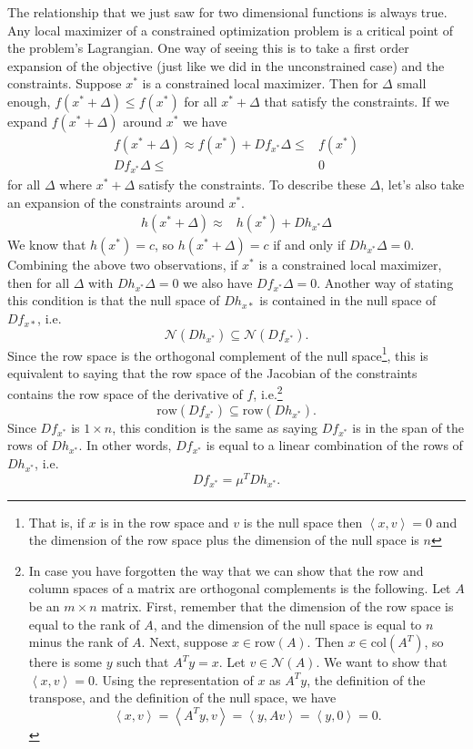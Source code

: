 \documentclass[12pt,reqno]{amsart}
\theoremstyle{definition}
\newcommand{\iprod}[2]{\left\langle {#1} , {#2} \right\rangle}
\begin{document}
The relationship that we just saw for two dimensional functions is
always true. Any local maximizer of a constrained optimization problem
is a critical point of the problem's Lagrangian. One way of seeing
this is to take a first order expansion of the objective (just like we
did in the unconstrained case) and the constraints. Suppose $x^*$ is a
constrained local maximizer. Then for $\Delta$ small enough, $f(x^* +
\Delta) \leq f(x^*)$ for all $x^*+ \Delta$ that satisfy the
constraints. If we expand $f(x^*+\Delta)$ around $x^*$ we have
\begin{align*}
  f(x^*+\Delta) \approx f(x^*) + Df_{x^*} \Delta \leq & f(x^*) \\
  Df_{x^*} \Delta \leq & 0 
\end{align*}
for all $\Delta$ where $x^* + \Delta$ satisfy the constraints. To describe these
$\Delta$, let's also take an expansion of the constraints around $x^*$.
\begin{align*}
  h(x^* + \Delta) \approx & h(x^*) + Dh_{x^*} \Delta
\end{align*}
We know that $h(x^*) = c$, so $h(x^* + \Delta) = c$ if and only if
$Dh_{x^*} \Delta = 0$. Combining the above two observations, if $x^*$
is a constrained local maximizer, then for all $\Delta$ with $Dh_{x^*}
\Delta = 0$ we also have $Df_{x^*} \Delta  = 0$. Another way of
stating this condition is that the null space of $Dh_{x*}$ is
contained in the null space of $Df_{x*}$, i.e.
\[ \mathcal{N}(Dh_{x^*}) \subseteq \mathcal{N}(Df_{x^*}). \] Since the
row space is the orthogonal complement of the null space\footnote{That
  is, if $x$ is in the row space and $v$ is the null space then
  $\iprod{x}{v} = 0$ and the dimension of the row space plus the
  dimension of the null space is $n$}, this is equivalent to saying
that the row space of the Jacobian of the constraints contains the row
space of the derivative of $f$, i.e.\footnote{In case you have
  forgotten the way that we can show that the row and column spaces of
  a matrix are orthogonal complements is the following. Let $A$ be an
  $m \times n$ matrix. First, remember that the dimension of the row
  space is equal to the rank of $A$, and the dimension of the null
  space is equal to $n$ minus the rank of $A$. Next, suppose $x \in
  \mathrm{row}(A)$. Then $x \in \mathrm{col}(A^T)$, so there is some
  $y$ such that $A^T y = x$. Let $v \in \mathcal{N}(A)$. We want to
  show that $\iprod{x}{v} = 0$. Using the representation of $x$ as
  $A^T y$, the definition of the transpose, and the definition of the
  null space, we have
  \[ \iprod{x}{v} = \iprod{A^T y}{v} = \iprod{y}{A v} = \iprod{y}{0} =
  0. \]
}
\[ \mathrm{row}(Df_{x^*}) \subseteq \mathrm{row}(Dh_{x^*}). \]
Since $Df_{x^*}$ is $1 \times n$,  this condition is the same as
saying $Df_{x^*}$ is in the span of the rows of $Dh_{x^*}$. In other
words, $Df_{x^*}$ is equal to a linear combination of the rows of
$Dh_{x^*}$, i.e. 
\[ Df_{x^*} = \mu^T Dh_{x^*}. \]
\end{document}
